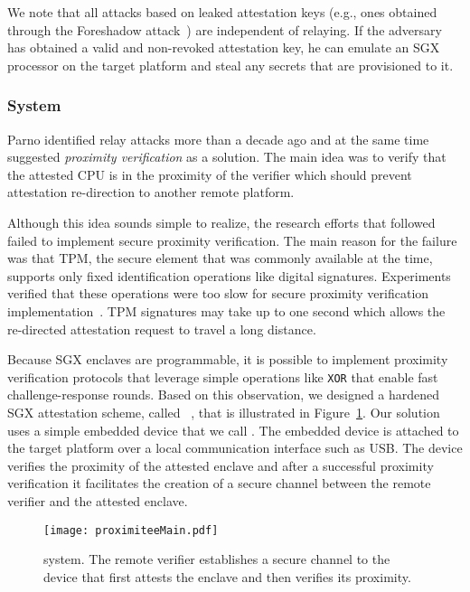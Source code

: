 We note that all attacks based on leaked attestation keys (e.g., ones obtained through the Foreshadow attack~\cite{van2018foreshadow}) are independent of relaying. If the adversary has obtained a valid and non-revoked attestation key, he can emulate an SGX processor on the target platform and steal any secrets that are provisioned to it.


\subsubsection*{\proximitee System}

Parno identified relay attacks more than a decade ago and at the same time suggested \emph{proximity verification} as a solution. The main idea was to verify that the attested CPU is in the proximity of the verifier which should prevent attestation re-direction to another remote platform. 

Although this idea sounds simple to realize, the research efforts that followed failed to implement secure proximity verification. The main reason for the failure was that TPM, the secure element that was commonly available at the time, supports only fixed identification operations like digital signatures. Experiments verified that these operations were too slow for secure proximity verification implementation~\cite{CatchingCuckoo}. TPM signatures may take up to one second which allows the re-directed attestation request to travel a long distance.

Because SGX enclaves are programmable, it is possible to implement proximity verification protocols that leverage simple operations like \texttt{XOR} that enable fast challenge-response rounds. Based on this observation, we designed a hardened SGX attestation scheme, called \proximitee~\cite{proximitee}, that is illustrated in Figure~\ref{fig:proximitee}. Our solution uses a simple embedded device that we call \key. The embedded device is attached to the target platform over a local communication interface such as USB. The \key device verifies the proximity of the attested enclave and after a successful proximity verification it facilitates the creation of a secure channel between the remote verifier and the attested enclave. 

\begin{figure}[t]
 \centering
  \texttt{[image: proximiteeMain.pdf]}
 \caption{\proximitee system. The remote verifier establishes a secure channel to the \key device that first attests the enclave and then verifies its proximity.}
 \label{fig:proximitee}
\end{figure}

